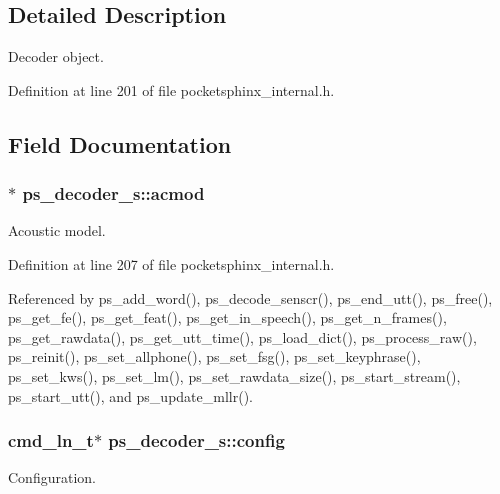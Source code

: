 \subsection{Detailed Description}
Decoder object. 

Definition at line 201 of file pocketsphinx\-\_\-internal.\-h.



\subsection{Field Documentation}
\subsubsection[{acmod}]{$\ast$ ps\-\_\-decoder\-\_\-s\-::acmod}\label{structps__decoder__s_af834d2bc1d44c1d9ef607b025413a0b8}


Acoustic model. 



Definition at line 207 of file pocketsphinx\-\_\-internal.\-h.



Referenced by ps\-\_\-add\-\_\-word(), ps\-\_\-decode\-\_\-senscr(), ps\-\_\-end\-\_\-utt(), ps\-\_\-free(), ps\-\_\-get\-\_\-fe(), ps\-\_\-get\-\_\-feat(), ps\-\_\-get\-\_\-in\-\_\-speech(), ps\-\_\-get\-\_\-n\-\_\-frames(), ps\-\_\-get\-\_\-rawdata(), ps\-\_\-get\-\_\-utt\-\_\-time(), ps\-\_\-load\-\_\-dict(), ps\-\_\-process\-\_\-raw(), ps\-\_\-reinit(), ps\-\_\-set\-\_\-allphone(), ps\-\_\-set\-\_\-fsg(), ps\-\_\-set\-\_\-keyphrase(), ps\-\_\-set\-\_\-kws(), ps\-\_\-set\-\_\-lm(), ps\-\_\-set\-\_\-rawdata\-\_\-size(), ps\-\_\-start\-\_\-stream(), ps\-\_\-start\-\_\-utt(), and ps\-\_\-update\-\_\-mllr().

\subsubsection[{config}]{\setlength{\rightskip}{0pt plus 5cm}cmd\-\_\-ln\-\_\-t$\ast$ ps\-\_\-decoder\-\_\-s\-::config}\label{structps__decoder__s_a0565ed97b32408bd05c8104f020cef05}


Configuration. 



